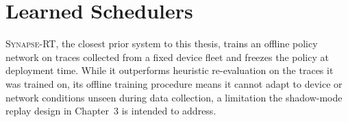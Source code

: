 \section{Learned Schedulers}

\textsc{Synapse-RT}, the closest prior system to this thesis, trains an offline policy network on traces collected from a fixed device fleet and freezes the policy at deployment time. While it outperforms heuristic re-evaluation on the traces it was trained on, its offline training procedure means it cannot adapt to device or network conditions unseen during data collection, a limitation the shadow-mode replay design in Chapter~3 is intended to address.
